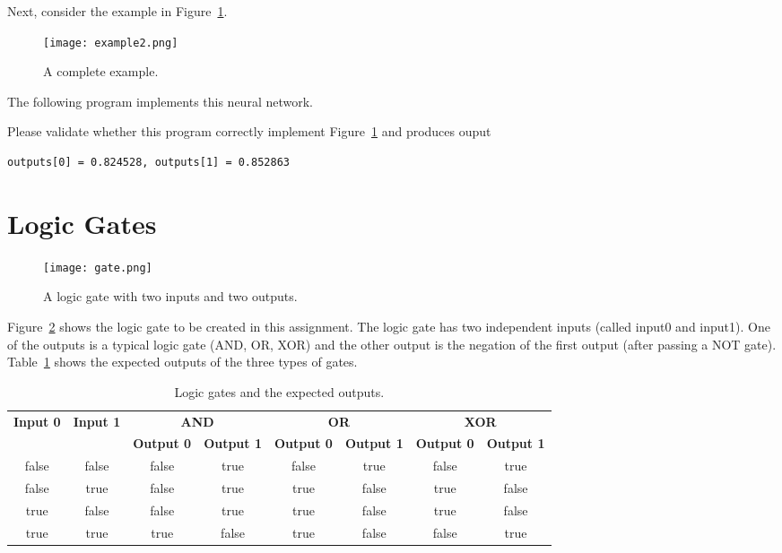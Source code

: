 Next, consider the  example in Figure~\ref{fig:example2}.

\begin{figure}[h]
\centering
{\texttt{[image: example2.png]}}
\caption{A complete example.}
  \label{fig:example2}
\end{figure}

\clearpage
The following program implements this neural network.

\resetlinenumber[1]
\linenumbers
\begin{tt}
  
\end{tt}
\nolinenumbers

Please validate whether this program correctly implement
Figure~\ref{fig:example2} and produces ouput

\begin{verbatim}
outputs[0] = 0.824528, outputs[1] = 0.852863
\end{verbatim}

\section{Logic Gates}


\begin{figure}[h]
\centering
{\texttt{[image: gate.png]}}
\caption{A logic gate with two inputs and two outputs.}
  \label{fig:gate}
\end{figure}

Figure~\ref{fig:gate} shows the logic gate to be created in this
assignment.  The logic gate has two independent inputs (called input0
and input1).  One of the outputs is a typical logic gate (AND, OR,
XOR) and the other output is the negation of the first output (after
passing a NOT gate).  Table~\ref{table:logicgates} shows the expected
outputs of the three types of gates.

\begin{table}
\begin{tabular}{|c|c||c|c||c|c||c|c||}  \hline
\multirow{2}{*}{\bf Input 0} &
\multirow{2}{*}{\bf Input 1} &
\multicolumn{2}{c||}{\bf AND} &
\multicolumn{2}{c||}{\bf OR} &
\multicolumn{2}{c||}{\bf XOR} \\
& & {\bf Output 0} & {\bf Output 1} &
{\bf Output 0} & {\bf Output 1} &
{\bf Output 0} & {\bf Output 1} \\ \hline

false & false & false & true & false & true & false & true \\ \hline

false & true & false & true & true & false & true & false \\ \hline

true & false & false & true & true & false & true & false \\ \hline

true & true & true & false & true & false & false & true \\ \hline
\end{tabular}
\caption{Logic gates and the expected outputs.}
\label{table:logicgates}
\end{table}

